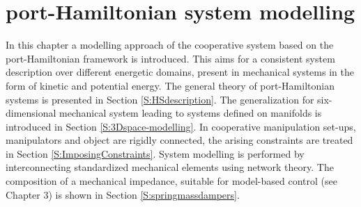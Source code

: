 \documentclass[a4paper,twoside, openright,12pt]{report}
\begin{document}
\chapter{port-Hamiltonian system modelling}\label{C:pHS modelling}
In this chapter a modelling approach of the cooperative   system based on the port-Hamiltonian framework is introduced. This aims for a consistent system description over different energetic domains, present in mechanical systems in the form of kinetic and potential energy. The general theory of port-Hamiltonian systems is presented in Section \ref{S:HSdescription}. The generalization for six-dimensional mechanical system leading to systems defined on manifolds is introduced in Section \ref{S:3Dspace-modelling}. In cooperative manipulation set-ups, manipulators and object are rigidly connected, the arising constraints are treated in Section \ref{S:ImposingConstraints}. 
System modelling is performed by interconnecting standardized mechanical elements using network theory. The composition of a mechanical impedance, suitable for model-based control (see Chapter 3) is shown in Section \ref{S:springmassdampers}.
  
\end{document}
